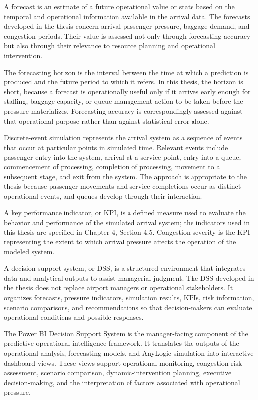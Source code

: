 A forecast is an estimate of a future operational value or state based on the temporal and operational information available in the arrival data. The forecasts developed in the thesis concern arrival-passenger pressure, baggage demand, and congestion periods. Their value is assessed not only through forecasting accuracy but also through their relevance to resource planning and operational intervention.

The forecasting horizon is the interval between the time at which a prediction is produced and the future period to which it refers. In this thesis, the horizon is short, because a forecast is operationally useful only if it arrives early enough for staffing, baggage-capacity, or queue-management action to be taken before the pressure materializes. Forecasting accuracy is correspondingly assessed against that operational purpose rather than against statistical error alone.

Discrete-event simulation represents the arrival system as a sequence of events that occur at particular points in simulated time. Relevant events include passenger entry into the system, arrival at a service point, entry into a queue, commencement of processing, completion of processing, movement to a subsequent stage, and exit from the system. The approach is appropriate to the thesis because passenger movements and service completions occur as distinct operational events, and queues develop through their interaction.

A key performance indicator, or KPI, is a defined measure used to evaluate the behavior and performance of the simulated arrival system; the indicators used in this thesis are specified in Chapter 4, Section 4.5. Congestion severity is the KPI representing the extent to which arrival pressure affects the operation of the modeled system.

A decision-support system, or DSS, is a structured environment that integrates data and analytical outputs to assist managerial judgment. The DSS developed in the thesis does not replace airport managers or operational stakeholders. It organizes forecasts, pressure indicators, simulation results, KPIs, risk information, scenario comparisons, and recommendations so that decision-makers can evaluate operational conditions and possible responses.

The Power BI Decision Support System is the manager-facing component of the predictive operational intelligence framework. It translates the outputs of the operational analysis, forecasting models, and AnyLogic simulation into interactive dashboard views. These views support operational monitoring, congestion-risk assessment, scenario comparison, dynamic-intervention planning, executive decision-making, and the interpretation of factors associated with operational pressure.

